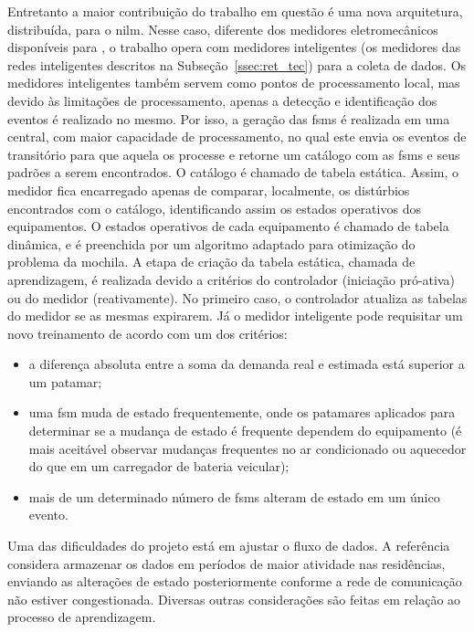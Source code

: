 \begin{enumerate}[label=\textbf{1.\arabic*},wide=\parindent]
\begin{enumerate}[label*=.\textbf{\arabic*},wide=\parindent]
\begin{itemize}[wide=\parindent]
Entretanto a maior contribuição do trabalho
em questão é uma nova arquitetura, distribuída, para o \gls{nilm}.
Nesse caso, diferente dos medidores eletromecânicos disponíveis para
\citeauthor*{nilm_baranski_summary_2004_21}, o trabalho opera com
medidores inteligentes (os medidores das redes inteligentes descritos
na Subseção~\ref{ssec:ret_tec}) para a coleta de
dados. Os medidores inteligentes também servem como pontos de
processamento local, mas devido às limitações de processamento, apenas
a detecção e identificação dos eventos é realizado no mesmo. Por isso,
a geração das \glspl{fsm} é realizada em uma central, com maior
capacidade de processamento, no qual este envia os eventos de
transitório para que aquela os processe e retorne um catálogo com as
\glspl{fsm} e seus padrões a serem encontrados. O catálogo é chamado
de tabela estática. Assim, o medidor fica encarregado apenas de
comparar, localmente, os distúrbios encontrados com o catálogo,
identificando assim os estados operativos dos equipamentos. O estados
operativos de cada equipamento é chamado de tabela dinâmica, e é
preenchida por um algoritmo adaptado para otimização do problema da
mochila. A etapa de criação da
tabela estática, chamada de aprendizagem, é realizada devido a
critérios do controlador (iniciação pró-ativa) ou do medidor
(reativamente). No primeiro caso, o controlador atualiza as tabelas do
medidor se as mesmas expirarem. Já o medidor inteligente pode
requisitar um novo treinamento de acordo com um dos critérios:

\begin{itemize}
\item a diferença absoluta entre a soma da demanda real e estimada
está superior a um patamar;
\item uma \gls{fsm} muda de estado frequentemente, onde os patamares
aplicados para determinar se a mudança de estado é frequente dependem
do equipamento (é mais aceitável observar mudanças frequentes no ar
condicionado ou aquecedor do que em um carregador de bateria
veicular);
\item mais de um determinado número de \glspl{fsm} alteram de estado
em um único evento.
\end{itemize}

Uma das dificuldades do projeto está em ajustar o fluxo de dados. A
referência considera armazenar os dados em períodos de maior atividade
nas residências, enviando as alterações de estado posteriormente
conforme a rede de comunicação não estiver congestionada. Diversas
outras considerações são feitas em relação ao processo de
aprendizagem.


\end{itemize}
\end{enumerate}
\end{enumerate}
